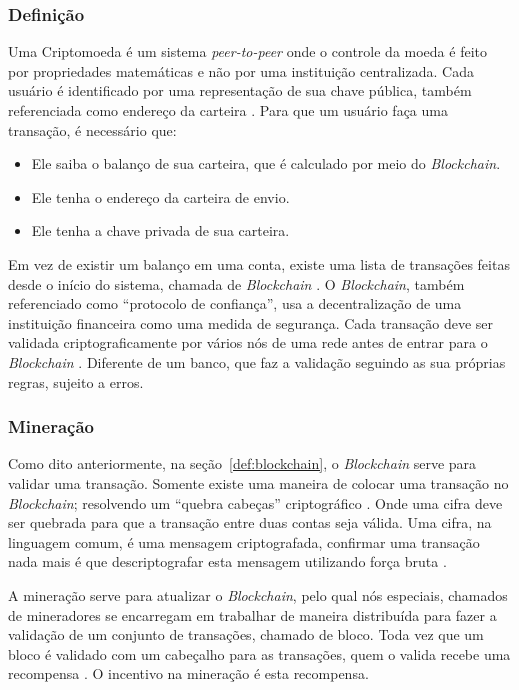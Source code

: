 \documentclass[
	article,			%
	12pt,				%
	openright,			%
	oneside,			%
	a4paper,			%
	chapter=TITLE,		%
	section=TITLE,		%
	subsection=TITLE,	%
	subsubsection=TITLE,%
	subsubsubsection=TITLE, %
	english,			%
	brazil,				%
	]{abntex2}
\begin{document}
\subsubsection{Definição}

Uma Criptomoeda é um sistema \emph{peer-to-peer} onde o controle da
moeda é feito por propriedades matemáticas e não por uma instituição
centralizada. Cada usuário é identificado por uma representação de sua
chave pública, também referenciada como endereço da carteira
\cite{Weber2012}. Para que um usuário faça uma transação, é necessário
que: 

\begin{itemize}
    \item Ele saiba o balanço de sua carteira, que é calculado por
        meio do \emph{Blockchain}.
    \item Ele tenha o endereço da carteira de envio.
    \item Ele tenha a chave privada de sua carteira.
\end{itemize}

Em vez de existir um balanço em uma conta, existe uma lista de
transações feitas desde o início do sistema, chamada de
\emph{Blockchain} \cite{Weber2012}\label{def:blockchain}. O
\emph{Blockchain}, também referenciado como ``protocolo de
confiança'', usa a decentralização de uma instituição financeira como
uma medida de segurança. Cada transação deve ser validada
criptograficamente por vários nós de uma rede antes de entrar para o
\emph{Blockchain} \cite{LChicarino}. Diferente de um banco, que faz a
validação seguindo as sua próprias regras, sujeito a erros.

\subsubsection{Mineração}

Como dito anteriormente, na seção~\ref{def:blockchain}, o
\emph{Blockchain} serve para validar uma transação. Somente existe uma
maneira de colocar uma transação no \emph{Blockchain}; resolvendo um
``quebra cabeças'' criptográfico \cite{Weber2012}. Onde uma cifra deve
ser quebrada para que a transação entre duas contas seja válida. Uma
cifra, na linguagem comum, é uma mensagem criptografada, confirmar uma
transação nada mais é que descriptografar esta mensagem utilizando
força bruta \cite{Arsov}.

A mineração serve para atualizar o \emph{Blockchain}, pelo qual nós
especiais, chamados de mineradores se encarregam em trabalhar de
maneira distribuída para fazer a validação de um conjunto de
transações, chamado de bloco. Toda vez que um bloco é validado com um
cabeçalho para as transações, quem o valida recebe uma recompensa
\cite{LChicarino}. O incentivo na mineração é esta recompensa.
\end{document}
